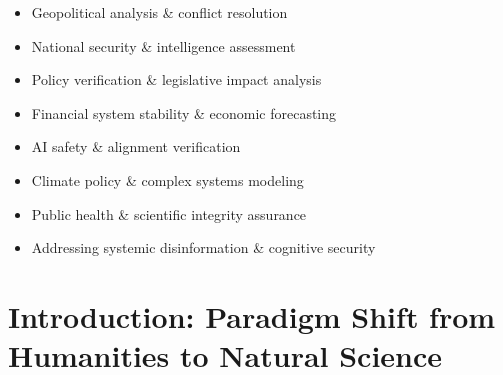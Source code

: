 \documentclass[11pt,a4paper]{article}
\theoremstyle{definition}
\theoremstyle{remark}
\begin{document}
\begin{small}
\begin{center}
\begin{minipage}{0.88\textwidth}
\begin{itemize}[nosep, itemsep=0.2em, topsep=0pt, leftmargin=1.5em]
    \item Geopolitical analysis \& conflict resolution
    \item National security \& intelligence assessment
    \item Policy verification \& legislative impact analysis
    \item Financial system stability \& economic forecasting
    \item AI safety \& alignment verification
    \item Climate policy \& complex systems modeling
    \item Public health \& scientific integrity assurance
    \item Addressing systemic disinformation \& cognitive security
\end{itemize}
\end{minipage}
\end{center}
\end{small}

\clearpage

\section{Introduction: Paradigm Shift from Humanities to Natural Science}
\end{document}
